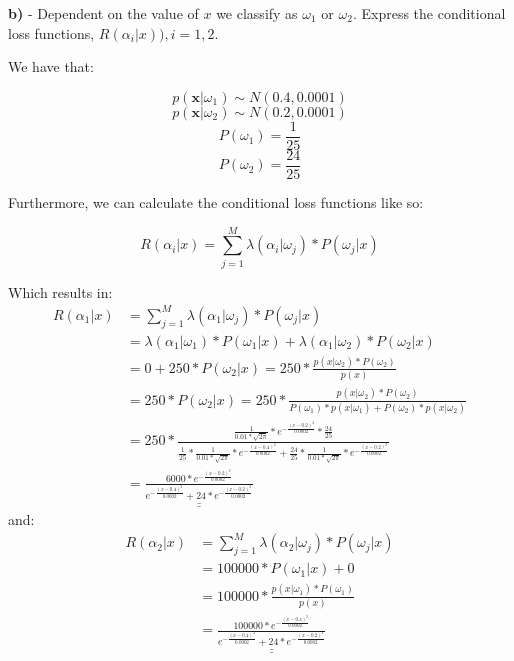 \documentclass{homeworg}
\begin{document}
\bigskip
\textbf{b)} - Dependent on the value of $x$ we classify as $\omega_1$ or $\omega_2$. Express the conditional loss functions, $R(\alpha_i|x)), i = 1, 2$.
\smallskip
\bigskip

We have that:

\begin{equation}
    p(\bm{x}|\omega_1) \sim N(0.4, 0.0001)
\end{equation}
\begin{equation}
    p(\bm{x}|\omega_2) \sim N(0.2, 0.0001)
\end{equation}
\begin{equation}
    P(\omega_1) = \frac{1}{25}
\end{equation}
\begin{equation}
    P(\omega_2) = \frac{24}{25}
\end{equation}

Furthermore, we can calculate the conditional loss functions like so:

\begin{equation}
    R(\alpha_i|x) = \sum_{j=1}^M \lambda(\alpha_i|\omega_j)*P(\omega_j|x)
\end{equation}

Which results in:
\begin{equation}
    \begin{aligned}
        R(\alpha_1|x) &= \sum_{j=1}^M \lambda(\alpha_1|\omega_j)*P(\omega_j|x)
        \\ &=
        \lambda(\alpha_1|\omega_1)*P(\omega_1|x) + \lambda(\alpha_1|\omega_2)*P(\omega_2|x)
        \\ &=
        0 + 250 * P(\omega_2|x) = 250*\frac{p(x|\omega_2)*P(\omega_2)}{p(x)}
        \\ &=
        250 * P(\omega_2|x) = 250*\frac{p(x|\omega_2)*P(\omega_2)}{P(\omega_1)*p(x|\omega_1) + P(\omega_2)*p(x|\omega_2)}
        \\ &=
        250 * \frac{\frac{1}{0.01*\sqrt{2\pi}}*e^{-\frac{(x-0.2)^2}{0.0002}}*\frac{24}{25}}{\frac{1}{25}*\frac{1}{0.01*\sqrt{2\pi}}*e^{-\frac{(x-0.4)^2}{0.0002}} + \frac{24}{25}*\frac{1}{0.01*\sqrt{2\pi}}*e^{-\frac{(x-0.2)^2}{0.0002}}}
        \\ &=
        \underline{\underline{\frac{6000*e^{-\frac{(x-0.2)^2}{0.0002}}}{e^{-\frac{(x-0.4)^2}{0.0002}} + 24*e^{-\frac{(x-0.2)^2}{0.0002}}}}}
    \end{aligned}
\end{equation}
and:
\begin{equation}
    \begin{aligned}
        R(\alpha_2|x) &= \sum_{j=1}^M \lambda(\alpha_2|\omega_j)*P(\omega_j|x)
        \\ &=
        100000*P(\omega_1|x) + 0 
        \\ &= 
        100000*\frac{p(x|\omega_1)*P(\omega_1)}{p(x)}
        \\ &=
        \underline{\underline{\frac{100000*e^{-\frac{(x-0.4)^2}{0.0002}}}{e^{-\frac{(x-0.4)^2}{0.0002}} + 24*e^{-\frac{(x-0.2)^2}{0.0002}}}}}
    \end{aligned}
\end{equation}
\end{document}
